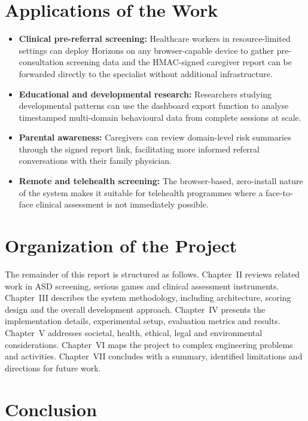 \documentclass[12pt,a4paper,oneside]{report}
\begin{document}
	\section{Applications of the Work}
	
	\begin{itemize}[leftmargin=0.5in]
		\item \textbf{Clinical pre-referral screening:} Healthcare workers in resource-limited settings can deploy Horizons on any browser-capable device to gather pre-consultation screening data and the HMAC-signed caregiver report can be forwarded directly to the specialist without additional infrastructure.
		\item \textbf{Educational and developmental research:} Researchers studying developmental patterns can use the dashboard export function to analyse timestamped multi-domain behavioural data from complete sessions at scale.
		\item \textbf{Parental awareness:} Caregivers can review domain-level risk summaries through the signed report link, facilitating more informed referral conversations with their family physician.
		\item \textbf{Remote and telehealth screening:} The browser-based, zero-install nature of the system makes it suitable for telehealth programmes where a face-to-face clinical assessment is not immediately possible.
	\end{itemize}
	
	\section{Organization of the Project}
	
	The remainder of this report is structured as follows. Chapter~II reviews related work in ASD screening, serious games and clinical assessment instruments. Chapter~III describes the system methodology, including architecture, scoring design and the overall development approach. Chapter~IV presents the implementation details, experimental setup, evaluation metrics and results. Chapter~V addresses societal, health, ethical, legal and environmental considerations. Chapter~VI maps the project to complex engineering problems and activities. Chapter~VII concludes with a summary, identified limitations and directions for future work.
	
	\section{Conclusion}
	
\end{document}
